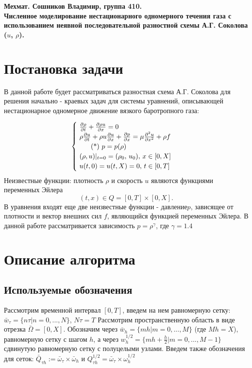 \documentclass[12pt]{article}
\begin{document}
\begin{center} \large \bf
Мехмат. Сошников Владимир, группа 410.\\
Численное моделирование нестационарного одномерного течения газа с использованием неявной последовательной разностной схемы А.Г. Соколова   ($u$, $\rho$). 
\end{center}

\section{Постановка задачи}

В данной работе будет рассматриваться разностная схема А.Г. Соколова для решения начально - краевых задач для системы уравнений, описывающей нестационарное одномерное движение вязкого баротропного газа:

\begin{equation*}
 \begin{cases}
   \text
     {
       $
         \frac {\partial \rho} {\partial t} + 
         \frac {\partial \rho u} {\partial x} = 
         0
       $
     }
   \\
   \text 
     {
       $
          \rho \frac {\partial u} {\partial t} +
          \rho u \frac {\partial u} {\partial x} + 
          \frac {\partial p} {\partial x} =
          \mu \frac {\partial^{2} u} {\partial x ^{2}} +
          \rho f
       $
     }
   \\\tag{*}
   \text 
     {
       $
         p = p (\rho)
       $
     } 
   \\
   \text 
     {
       $
        (\rho, u)|_{t = 0} = (\rho_{0}, \,u_{0}), \,  x \in [0, X]
       $
     } 
   \\
   \text 
     {
       $
        u (t, 0) = u (t, X) = 0, \,t \in [0, T]
       $
     } 
 \end{cases}
\end{equation*}
Неизвестные функции: плотность $\rho$ и скорость $u$ являются функциями переменных Эйлера
$$
(t,x) \in Q = [0,T] \times [0,X].
$$
В уравнения входят еще две неизвестные функции - давление$p$, зависящее от плотности и вектор внешних сил $f$, являющийся функцией переменных Эйлера.
В данной работе рассматривается зависимость $p = \rho ^{\gamma}$, где $\gamma = 1.4$
\section{Описание алгоритма}
\subsection{Используемые обозначения}
Рассмотрим временной интервал $[0,T]$, введем на нем равномерную сетку:
$ \bar w_{\tau} = \{n \tau | n = 0,...,N\}$, $N \tau = T$
Рассмотрим пространственную область в виде отрезка $\bar \Omega = [0, X]$. Обозначим  через $\bar w_{h} = \{mh|m = 0,...,M\}$ (где $Mh = X$), равномерную сетку с шагом $h$, а
через $w_{h}^{1/2} = \{mh + \frac{h}{2} | m = 0,..., M - 1\}$ сдвинутую равномерную сетку с полуцелыми узлами.
Введем также обозначения для сеток:
$
\bar Q_{\tau h} := \bar \omega_{\tau} \times \bar \omega_{h}
$
и 
$
Q_{\tau h}^{1/2} = \bar \omega_{\tau} \times \omega_{h}^{1/2}
$
\end{document}
